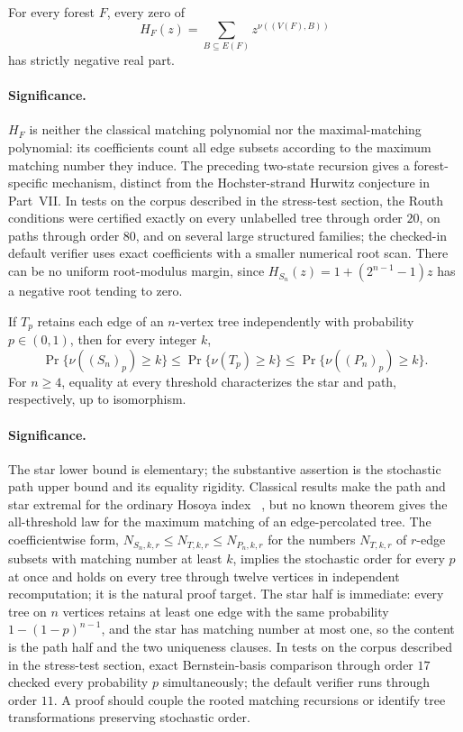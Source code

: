 \begin{conjecture}\label{as7}
For every forest $F$, every zero of
\[
 H_F(z)=\sum_{B\subseteq E(F)}z^{\nu((V(F),B))}
\]
has strictly negative real part.
\end{conjecture}

\paragraph{Significance.}
$H_F$ is neither the classical matching polynomial nor the maximal-matching
polynomial: its coefficients count all edge subsets according to the maximum
matching number they induce.  The preceding two-state recursion gives a
forest-specific mechanism, distinct from the Hochster-strand Hurwitz
conjecture in Part~VII.  In tests on the corpus described in the stress-test section, the Routh
conditions were certified exactly on every unlabelled tree through order
$20$, on paths through order $80$, and on several large structured
families; the checked-in default verifier uses exact coefficients with a
smaller numerical root scan.
There can be no uniform root-modulus margin, since
$H_{S_n}(z)=1+(2^{n-1}-1)z$ has a negative root tending to zero.

\begin{conjecture}\label{as8}
If $T_p$ retains each edge of an $n$-vertex tree independently with
probability $p\in(0,1)$, then for every integer $k$,
\[
 \Pr\{\nu((S_n)_p)\ge k\}\le
 \Pr\{\nu(T_p)\ge k\}\le
 \Pr\{\nu((P_n)_p)\ge k\}.
\]
For $n\ge4$, equality at every threshold characterizes the star and path,
respectively, up to isomorphism.
\end{conjecture}

\paragraph{Significance.}
The star lower bound is elementary; the substantive assertion is the
stochastic path upper bound and its equality rigidity.  Classical results
make the path and star extremal for the ordinary Hosoya index
~\cite{HuangShiXu18}, but no known theorem gives the all-threshold
law for the maximum matching of an edge-percolated tree.  The coefficientwise form, $N_{S_n,k,r}\le N_{T,k,r}\le N_{P_n,k,r}$ for the numbers $N_{T,k,r}$ of $r$-edge subsets with matching number at least $k$, implies the stochastic order for every $p$ at once and holds on every tree through twelve vertices in independent recomputation; it is the natural proof target.  The star half is immediate: every tree on $n$ vertices retains at least one edge with the same probability $1-(1-p)^{n-1}$, and the star has matching number at most one, so the content is the path half and the two uniqueness clauses.  In tests on the corpus described in the stress-test section, exact
Bernstein-basis comparison through order $17$ checked every probability $p$
simultaneously; the default verifier runs through order $11$.  A proof should
couple the rooted matching recursions or identify tree transformations
preserving stochastic order.

